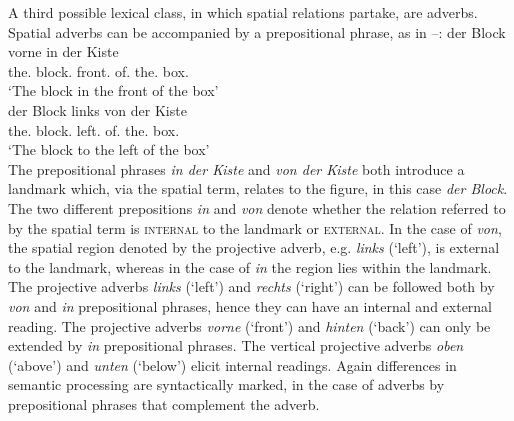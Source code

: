 A third possible lexical class, in which spatial relations partake, are adverbs. 
Spatial adverbs can be accompanied
by a prepositional phrase, as in --:
\ea
\label{e:5:der-block-vorne-in-der-kiste}
\gll der Block vorne in der Kiste\\
the.{\NOM} block.{\NOM} front.{\ADV} of.{\PREP} the.{\DAT} box.{\DAT}\\
\glt `The block in the front of the box'\\
\z
\ea
\label{e:5:der-block-links-von-der-kiste}
\gll der Block links von der Kiste\\
the.{\NOM} block.{\NOM} left.{\ADV} of.{\PREP} the.{\DAT} box.{\DAT}\\
\glt `The block to the left of the box'\\
\z
The prepositional phrases \textit{in der Kiste} and \textit{von der Kiste}  both introduce
a landmark which, via
the spatial term, relates to the figure, in this case \textit{der Block}. The two different prepositions \textit{in} and \textit{von}
denote whether the relation referred to by the spatial term is \textsc{internal} 
to the landmark or \textsc{external}. In the case of \textit{von}, the spatial
region denoted by the projective adverb, e.g. \textit{links} (`left'), is external to the 
landmark, whereas in the case of \textit{in} the region lies within the landmark. 
The projective 
adverbs \textit{links} (`left') and \textit{rechts} (`right') can be followed both by 
\textit{von} and \textit{in} prepositional phrases, hence they can have an internal
and external reading. The projective adverbs \textit{vorne} (`front') 
and \textit{hinten} (`back') can only be extended by \textit{in} prepositional phrases. 
The vertical projective adverbs \textit{oben} (`above') and \textit{unten} (`below')
elicit internal readings. Again differences in semantic processing are 
syntactically marked, in the case of adverbs by prepositional phrases
that complement the adverb.


